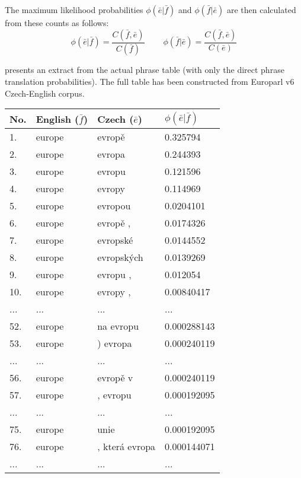 The maximum likelihood probabilities $\phi(\bar{e}|\bar{f})$ and
$\phi(\bar{f}|\bar{e})$ are then calculated from these counts as follows:
\begin{equation}
  \phi(\bar{e}|\bar{f}) = \frac{C(\bar{f},\bar{e})}{C(\bar{f})}
  ~~~~~~~~~~ %
  \phi(\bar{f}|\bar{e}) = \frac{C(\bar{f},\bar{e})}{C(\bar{e})}
\end{equation}

 presents an extract from the actual phrase table
(with only the direct phrase translation probabilities).
The full table has been constructed from Europarl v6 Czech-English
corpus.

\begin{table}[h]
\centering
\begin{tabular}{ l l l l}
No. & English ($\bar{f}$) & Czech ($\bar{e}$) & $\phi(\bar{e}|\bar{f})$ \\
\hline
\hline
1. & europe & evropě & 0.325794 \\
2. & europe & evropa & 0.244393 \\
3. & europe & evropu & 0.121596 \\
4. & europe & evropy & 0.114969 \\
5. & europe & evropou & 0.0204101 \\
6. & europe & evropě , & 0.0174326 \\
7. & europe & evropské & 0.0144552 \\
8. & europe & evropských & 0.0139269 \\
9. & europe & evropu , & 0.012054 \\
10. & europe & evropy , & 0.00840417 \\
... & ... & ... & ... \\
52. & europe & na evropu & 0.000288143 \\
53. & europe & ) evropa & 0.000240119 \\
... & ... & ... & ... \\
56. & europe & evropě v & 0.000240119 \\
57. & europe & , evropu & 0.000192095 \\
... & ... & ... & ... \\
75. & europe & unie & 0.000192095 \\
76. & europe & , která evropa & 0.000144071 \\
... & ... & ... & ... \\

\end{tabular}
\end{table}

